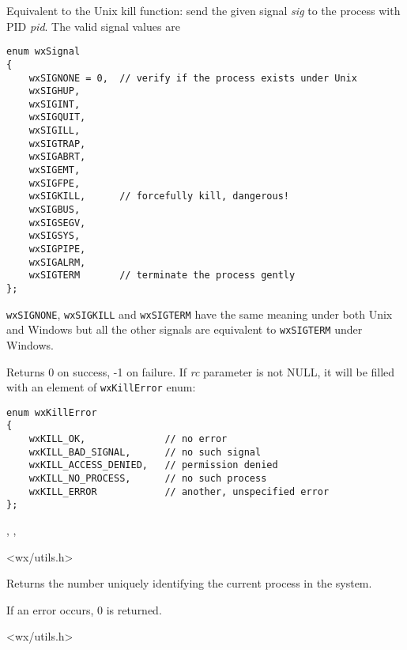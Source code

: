 
Equivalent to the Unix kill function: send the given signal {\it sig} to the
process with PID {\it pid}. The valid signal values are

\begin{verbatim}
enum wxSignal
{
    wxSIGNONE = 0,  // verify if the process exists under Unix
    wxSIGHUP,
    wxSIGINT,
    wxSIGQUIT,
    wxSIGILL,
    wxSIGTRAP,
    wxSIGABRT,
    wxSIGEMT,
    wxSIGFPE,
    wxSIGKILL,      // forcefully kill, dangerous!
    wxSIGBUS,
    wxSIGSEGV,
    wxSIGSYS,
    wxSIGPIPE,
    wxSIGALRM,
    wxSIGTERM       // terminate the process gently
};
\end{verbatim}

{\tt wxSIGNONE}, {\tt wxSIGKILL} and {\tt wxSIGTERM} have the same meaning
under both Unix and Windows but all the other signals are equivalent to 
{\tt wxSIGTERM} under Windows.

Returns 0 on success, -1 on failure. If {\it rc} parameter is not NULL, it will
be filled with an element of {\tt wxKillError} enum:

\begin{verbatim}
enum wxKillError
{
    wxKILL_OK,              // no error
    wxKILL_BAD_SIGNAL,      // no such signal
    wxKILL_ACCESS_DENIED,   // permission denied
    wxKILL_NO_PROCESS,      // no such process
    wxKILL_ERROR            // another, unspecified error
};
\end{verbatim}


,\rtfsp
{},\rtfsp
{}


<wx/utils.h>


\label{wxgetprocessid}


Returns the number uniquely identifying the current process in the system.

If an error occurs, $0$ is returned.


<wx/utils.h>


\label{wxshell}


